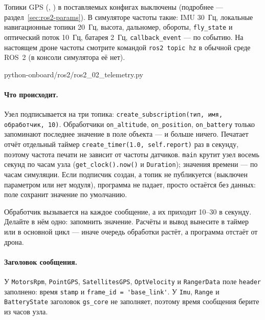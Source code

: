 Топики GPS (, ) в поставляемых конфигах выключены (подробнее --- раздел~\ref{sec:ros2-params}). В симуляторе частоты такие: IMU 30~Гц, локальные навигационные топики 20~Гц, высота, дальномер, обороты, \verb|fly_state| и оптический поток 10~Гц, батарея 2~Гц, \verb|callback_event| --- по событию. На настоящем дроне частоты смотрите командой \verb|ros2 topic hz| в обычной среде ROS~2 (в консоли симулятора её нет).

\begin{codefile}[python]{python-onboard/ros2/ros2_02_telemetry.py}
\end{codefile}

\paragraph{Что происходит.} Узел подписывается на три топика: \verb|create_subscription(тип, имя, обработчик, 10)|. Обработчики \verb|on_altitude|, \verb|on_position|, \verb|on_battery| только запоминают последнее значение в поле объекта --- и больше ничего. Печатает отчёт отдельный таймер \verb|create_timer(1.0, self.report)| раз в секунду, поэтому частота печати не зависит от частоты датчиков. \verb|main| крутит узел восемь секунд по часам узла (\verb|get_clock().now()| и \verb|Duration|); значения времени --- по часам симуляции. Если подписчик создан, а топик не публикуется (выключен параметром или нет модуля), программа не падает, просто остаётся без данных: поле сохранит значение по умолчанию.

\begin{rulebox}
Обработчик вызывается на каждое сообщение, а их приходит 10--30 в секунду. Делайте в нём одно: запомнить значение. Расчёты и вывод вынесите в таймер или в основной цикл --- иначе очередь обработки растёт, а программа отстаёт от дрона.
\end{rulebox}

\paragraph{Заголовок сообщения.} У \verb|MotorsRpm|, \verb|PointGPS|, \verb|SatellitesGPS|, \verb|OptVelocity| и \verb|RangerData| поле \verb|header| заполнено: время \verb|stamp| и \verb|frame_id = 'base_link'|. У \verb|Imu|, \verb|Range| и \verb|BatteryState| заголовок \texttt{gs\_core} не заполняет, поэтому время сообщения берите из часов узла.

